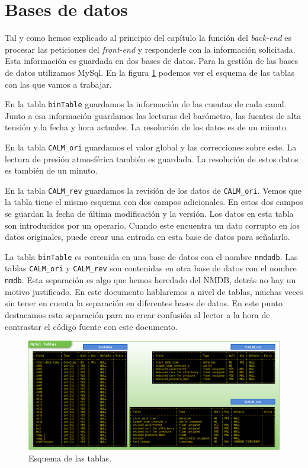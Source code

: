 \section{Bases de datos}
	Tal y como hemos explicado al principio del capítulo la función del \emph{back-end} es  procesar las peticiones del \emph{front-end} y
	responderle con la información solicitada. Esta información es guardada en dos bases de datos. Para la gestión de las bases de datos
	utilizamos MySql\cite{MySql}. En la figura \ref{fig:tablas} podemos ver el esquema de las tablas con las que vamos a trabajar.
	\par
	En la tabla \texttt{binTable} guardamos la información de las cuentas de cada canal. Junto a esa información guardamos las lecturas del
	barómetro, las fuentes de alta tensión y la fecha y hora actuales. La resolución de los datos es de un minuto.
	\par
	En la tabla \texttt{CALM\_ori} guardamos el valor global y las correcciones sobre este. La lectura de presión atmosférica también es guardada.
	La resolución de estos datos es también de un minuto.
	\par
	En la tabla \texttt{CALM\_rev} guardamos la revisión de los datos de \texttt{CALM\_ori}. Vemos que la tabla tiene el mismo esquema con dos
	campos adicionales. En estos dos campos se guardan la fecha de última modificación y la versión. Los datos en esta tabla son introducidos por
	un operario. Cuando este encuentra un dato corrupto en los datos originales, puede crear una entrada en esta base de datos para señalarlo.
	\par
	La tabla \texttt{binTable} es contenida en una base de datos con el nombre \texttt{nmdadb}. Las tablas \texttt{CALM\_ori} y \texttt{CALM\_rev}
	son contenidas en otra base de datos con el nombre \texttt{nmdb}. Esta separación es algo que hemos heredado del NMDB, detrás no hay un motivo
	justificado. En este documento hablaremos a nivel de tablas, muchas veces sin tener en cuenta la separación en diferentes bases de datos. En
	este punto destacamos esta separación para no crear confusión al lector a la hora de contrastar el código fuente con este documento. 
	\begin{figure}[h]
		\centering
		\includegraphics[keepaspectratio, width=1\textwidth]{./img/tablas.png}
		\caption{Esquema de las tablas.}
		\label{fig:tablas}
	\end{figure}

